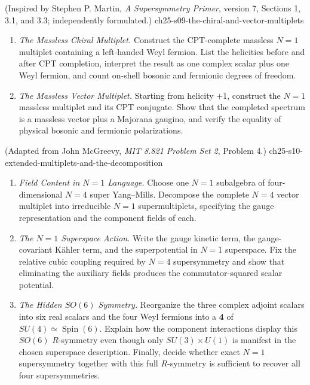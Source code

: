 \begin{enumerate}
    {(Inspired by Stephen P. Martin, \emph{A Supersymmetry Primer}, version 7, Sections 1, 3.1, and 3.3; independently formulated.)}
    {ch25-s09-the-chiral-and-vector-multiplets}
  \begin{enumerate}
    \item \emph{The Massless Chiral Multiplet.}
    Construct the CPT-complete massless \(N=1\) multiplet containing a
      left-handed Weyl fermion.  List the helicities before and after CPT
      completion, interpret the result as one complex scalar plus one Weyl
      fermion, and count on-shell bosonic and fermionic degrees of freedom.
    \item \emph{The Massless Vector Multiplet.}
    Starting from helicity \(+1\), construct the \(N=1\) massless multiplet
      and its CPT conjugate.  Show that the completed spectrum is a massless
      vector plus a Majorana gaugino, and verify the equality of physical
      bosonic and fermionic polarizations.
  \end{enumerate}

    {(Adapted from John McGreevy, \emph{MIT 8.821 Problem Set 2}, Problem 4.)}
    {ch25-s10-extended-multiplets-and-the-decomposition}
  \begin{enumerate}
    \item \emph{Field Content in \(N=1\) Language.}
    Choose one \(N=1\) subalgebra of four-dimensional \(N=4\) super
      Yang--Mills.  Decompose the complete \(N=4\) vector multiplet into
      irreducible \(N=1\) supermultiplets, specifying the gauge representation
      and the component fields of each.
    \item \emph{The \(N=1\) Superspace Action.}
    Write the gauge kinetic term, the gauge-covariant Kähler term, and the
      superpotential in \(N=1\) superspace.  Fix the relative cubic coupling
      required by \(N=4\) supersymmetry and show that eliminating the auxiliary
      fields produces the commutator-squared scalar potential.
    \item \emph{The Hidden \(SO(6)\) Symmetry.}
    Reorganize the three complex adjoint scalars into six real scalars and the
      four Weyl fermions into a \(\mathbf4\) of
      \(SU(4)\simeq\operatorname{Spin}(6)\).
      Explain how the component interactions display this \(SO(6)\)
      \(R\)-symmetry even though only \(SU(3)\times U(1)\) is manifest in the
      chosen superspace description.  Finally, decide whether exact \(N=1\)
      supersymmetry together with this full \(R\)-symmetry is sufficient to
      recover all four supersymmetries.
  \end{enumerate}


\end{enumerate}
